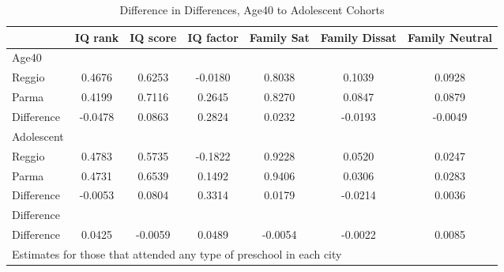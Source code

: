 \begin{table}[htbp]\centering
\caption{Difference in Differences, Age40 to Adolescent Cohorts}
\begin{tabular}{l*{6}{c}}
\hline\hline
            &     IQ rank&    IQ score&   IQ factor&  Family Sat&Family Dissat&Family Neutral\\
\hline
Age40       &            &            &            &            &            &            \\
Reggio      &      0.4676&      0.6253&     -0.0180&      0.8038&      0.1039&      0.0928\\
Parma       &      0.4199&      0.7116&      0.2645&      0.8270&      0.0847&      0.0879\\
Difference  &     -0.0478&      0.0863&      0.2824&      0.0232&     -0.0193&     -0.0049\\
\hline
Adolescent  &            &            &            &            &            &            \\
Reggio      &      0.4783&      0.5735&     -0.1822&      0.9228&      0.0520&      0.0247\\
Parma       &      0.4731&      0.6539&      0.1492&      0.9406&      0.0306&      0.0283\\
Difference  &     -0.0053&      0.0804&      0.3314&      0.0179&     -0.0214&      0.0036\\
\hline
Difference  &            &            &            &            &            &            \\
Difference  &      0.0425&     -0.0059&      0.0489&     -0.0054&     -0.0022&      0.0085\\
\hline\hline
\multicolumn{7}{l}{\footnotesize Estimates for those that attended any type of preschool in each city}\\
\end{tabular}
\end{table}
